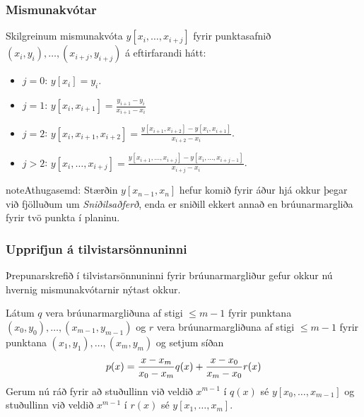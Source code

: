 \documentclass[a4paper,10pt,icelandic]{sphinxmanual}
\begin{document}
\subsubsection{Mismunakvótar}
\label{kafli03:index-9}\label{kafli03:mismunakvotar}
Skilgreinum mismunakvóta \(y[x_i,\ldots,x_{i+j}]\) fyrir
punktasafnið \((x_i,y_i),\ldots,(x_{i+j},y_{i+j})\) á eftirfarandi
hátt:
\begin{itemize}
\item {} 
\(j=0\): \(y[x_i] = y_i\).

\item {} 
\(j=1\): \(y[x_i,x_{i+1}] = \frac{y_{i+1}-y_i}{x_{i+1}-x_i}\)

\item {} 
\(j=2\):
\(y[x_i,x_{i+1},x_{i+2}] = \frac{y[x_{i+1},x_{i+2}] - y[x_i,x_{i+1}]}{x_{i+2}-x_i}\).

\item {} 
\(j>2\):
\(y[x_i,\ldots,x_{i+j}] = \frac{y[x_{i+1},\ldots,x_{i+j}] - y[x_i,\ldots,x_{i+j-1}]}{x_{i+j}-x_i}\).

\end{itemize}

\begin{notice}{note}{Athugasemd:}
Stærðin \(y[x_{n-1},x_n]\) hefur komið fyrir áður
hjá okkur þegar við fjölluðum um \emph{Sniðilsaðferð}, enda er sniðill
ekkert annað en brúunarmargliða fyrir tvö punkta í planinu.
\end{notice}


\subsubsection{Upprifjun á tilvistarsönnuninni}
\label{kafli03:upprifjun-a-tilvistarsonnuninni}
Þrepunarskrefið í tilvistarsönnuninni
fyrir brúunarmargliður gefur okkur nú hvernig mismunakvótarnir nýtast okkur.

Látum \(q\) vera brúunarmargliðuna af stigi \(\leq m-1\) fyrir
punktana \((x_0,y_0), \ldots,
(x_{m-1},y_{m-1})\) og \(r\) vera brúunarmargliðuna af stigi
\(\leq m-1\) fyrir punktana \((x_1,y_1), \ldots, (x_m,y_m)\) og
setjum síðan
\begin{gather}
\begin{split}p(x) = \frac{x-x_m}{x_0-x_m}q(x) + \frac{x-x_0}{x_m-x_0}r(x)\end{split}\notag
\end{gather}
Gerum nú ráð fyrir að stuðullinn við veldið \(x^{m-1}\) í
\(q(x)\) sé \(y[x_0, \ldots, x_{m-1}]\) og stuðullinn við veldið
\(x^{m-1}\) í \(r(x)\) sé \(y[x_1, \ldots, x_m]\).
\end{document}

